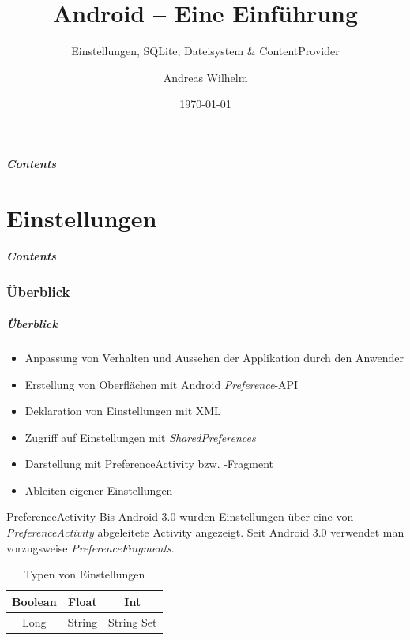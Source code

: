 \title{Android -- Eine Einführung}
\subtitle{Einstellungen, SQLite, Dateisystem \& ContentProvider}
\author[A. Wilhelm]{Andreas Wilhelm}
\titlegraphic{}
\date{\today}

\begin{frame}[plain]
  \titlepage
\end{frame}

\section[Contents]{}
\begin{frame}
	\frametitle{Contents}
	\tableofcontents[onlyparts]
\end{frame}

\part{Einstellungen}
\frame{\partpage}
\begin{frame}
	\frametitle{Contents}
	\tableofcontents[]
\end{frame}

\section{Überblick}
\begin{frame}
   \frametitle{Überblick}
   \begin{itemize}
      \item Anpassung von Verhalten und Aussehen der Applikation durch den 
         Anwender
      \item Erstellung von Oberflächen mit Android \emph{Preference}-API 
      \item Deklaration von Einstellungen mit XML
      \item Zugriff auf Einstellungen mit \emph{SharedPreferences}
      \item Darstellung mit PreferenceActivity bzw. -Fragment
      \item Ableiten eigener Einstellungen
   \end{itemize}

   \begin{alertblock}{PreferenceActivity}
      Bis Android 3.0 wurden Einstellungen über eine von \emph{PreferenceActivity} 
      abgeleitete Activity angezeigt. Seit Android 3.0 verwendet man 
      vorzugsweise \emph{PreferenceFragments}.
   \end{alertblock}

   \begin{table}[t]
      \begin{center}
         \begin{tabular}{c|c|c}
            Boolean & Float & Int\\
            \hline
            Long & String & String Set\\
         \end{tabular}
         \label{tab:preference_types}
         \caption{Typen von Einstellungen}
      \end{center}
   \end{table}
\end{frame}

